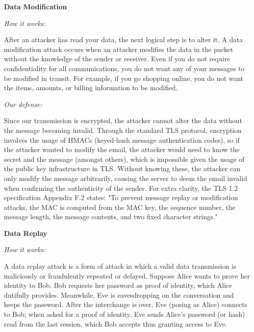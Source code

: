 \documentclass[a4paper,twoside,10pt]{report}
\begin{document}
\vspace{2.5mm}
\noindent
{\large\textbf{Data Modification}}

\vspace{1mm}
\noindent
\textit{How it works: }

After an attacker has read your data, the next logical step is to alter it. A data modification attack occurs when an attacker modifies the data in the packet without the knowledge of the sender or receiver. Even if you do not require confidentiality for all communications, you do not want any of your messages to be modified in transit. For example, if you go shopping online, you do not want the items, amounts, or billing information to be modified.

\vspace{2.5mm}
\noindent
\textit{Our defense: }

Since our transmission is encrypted, the attacker cannot alter the data without the message becoming invalid. Through the standard TLS protocol, encryption involves the usage of HMACs (keyed-hash message authentication codes), so if the attacker wanted to modify the email, the attacker would need to know the secret and the message (amongst others), which is impossible given the usage of the public key infrastructure in TLS. Without knowing these, the attacker can only modify the message arbitrarily, causing the server to deem the email invalid when confirming the authenticity of the sender. For extra clarity, the TLS 1.2 specification Appendix F.2 states: "To prevent message replay or modification attacks, the MAC is computed from the MAC key, the sequence number, the message length, the message contents, and two fixed character strings."

\vspace{2.5mm}
\noindent
{\large\textbf{Data Replay}}

\vspace{1mm}
\noindent
\textit{How it works: }

A data replay attack is a form of attack in which a valid data transmission is maliciously or fraudulently repeated or delayed. Suppose Alice wants to prove her identity to Bob. Bob requests her password as proof of identity, which Alice dutifully provides. Meanwhile, Eve is eavesdropping on the conversation and keeps the password. After the interchange is over, Eve (posing as Alice) connects to Bob; when asked for a proof of identity, Eve sends Alice's password (or hash) read from the last session, which Bob accepts thus granting access to Eve.
\end{document}
